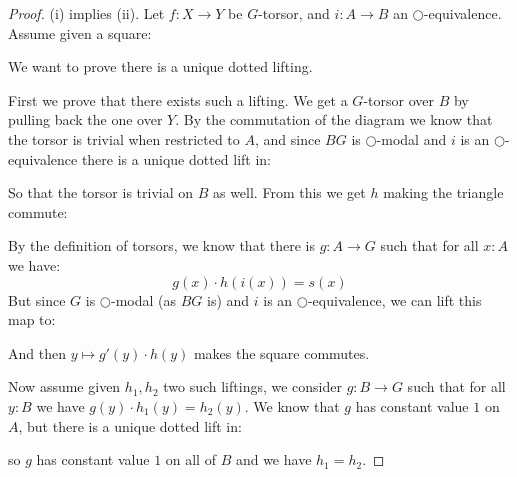 \begin{proof}
(i) implies (ii). Let $f:X\to Y$ be $G$-torsor, and $i:A\to B$ an $\bigcirc$-equivalence. Assume given a square:
  \begin{center}
  \end{center}
  We want to prove there is a unique dotted lifting. 
  
  First we prove that there exists such a lifting. We get a $G$-torsor over $B$ by pulling back the one over $Y$. By the commutation of the diagram we know that the torsor is trivial when restricted to $A$, and since $BG$ is $\bigcirc$-modal and $i$ is an $\bigcirc$-equivalence there is a unique dotted lift in:
    \begin{center}
  \end{center}
  So that the torsor is trivial on $B$ as well. From this we get $h$ making the triangle commute:
    \begin{center}
  \end{center}
  By the definition of torsors, we know that there is $g:A\to G$ such that for all $x:A$ we have:
  \[g(x)\cdot h(i(x)) = s(x)\]
  But since $G$ is $\bigcirc$-modal (as $BG$ is) and $i$ is an $\bigcirc$-equivalence, we can lift this map to:
    \begin{center}
  \end{center}
  And then $y\mapsto g'(y)\cdot h(y)$ makes the square commutes.
  
  Now assume given $h_1,h_2$ two such liftings, we consider $g:B\to G$ such that for all $y:B$ we have $g(y)\cdot h_1(y) = h_2(y)$. We know that $g$ has constant value $1$ on $A$, but there is a unique dotted lift in:
      \begin{center}
  \end{center}
  so $g$ has constant value $1$ on all of $B$ and we have $h_1=h_2$.
  

\end{proof}
